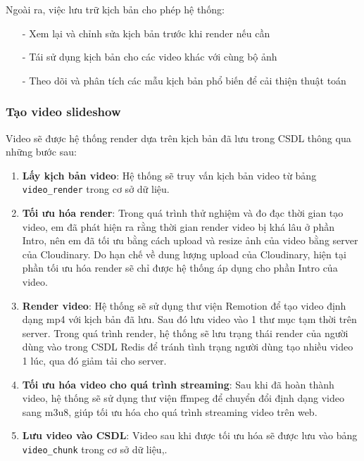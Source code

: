 Ngoài ra, việc lưu trữ kịch bản cho phép hệ thống:
\begin{itemize}
    \item[-] Xem lại và chỉnh sửa kịch bản trước khi render nếu cần
    \item[-] Tái sử dụng kịch bản cho các video khác với cùng bộ ảnh
    \item[-] Theo dõi và phân tích các mẫu kịch bản phổ biến để cải thiện thuật toán
\end{itemize}

\subsubsection{Tạo video slideshow}
Video sẽ được hệ thống render dựa trên kịch bản đã lưu trong CSDL thông qua những bước sau:

\begin{enumerate}
    \item \textbf{Lấy kịch bản video}: Hệ thống sẽ truy vấn kịch bản video từ bảng \texttt{video\_render} trong cơ sở dữ liệu.
    \item \textbf{Tối ưu hóa render}: Trong quá trình thử nghiệm và đo đạc thời gian tạo video, em đã phát hiện ra rằng thời gian render video bị khá lâu ở phần Intro, nên em đã tối ưu bằng cách upload và resize ảnh của video bằng server của Cloudinary. Do hạn chế về dung lượng upload của Cloudinary, hiện tại phần tối ưu hóa render sẽ chỉ được hệ thống áp dụng cho phần Intro của video.
    \item \textbf{Render video}: Hệ thống sẽ sử dụng thư viện Remotion để tạo video định dạng mp4 với kịch bản đã lưu. Sau đó lưu video vào 1 thư mục tạm thời trên server. Trong quá trình render, hệ thống sẽ lưu trạng thái render của người dùng vào trong CSDL Redis để tránh tình trạng người dùng tạo nhiều video 1 lúc, qua đó giảm tải cho server.
    \item \textbf{Tối ưu hóa video cho quá trình streaming}: Sau khi đã hoàn thành video, hệ thống sẽ sử dụng thư viện ffmpeg để chuyển đổi định dạng video sang m3u8, giúp tối ưu hóa cho quá trình streaming video trên web. 
    \item \textbf{Lưu video vào CSDL}: Video sau khi được tối ưu hóa sẽ được lưu vào bảng \texttt{video\_chunk} trong cơ sở dữ liệu,.
\end{enumerate}

